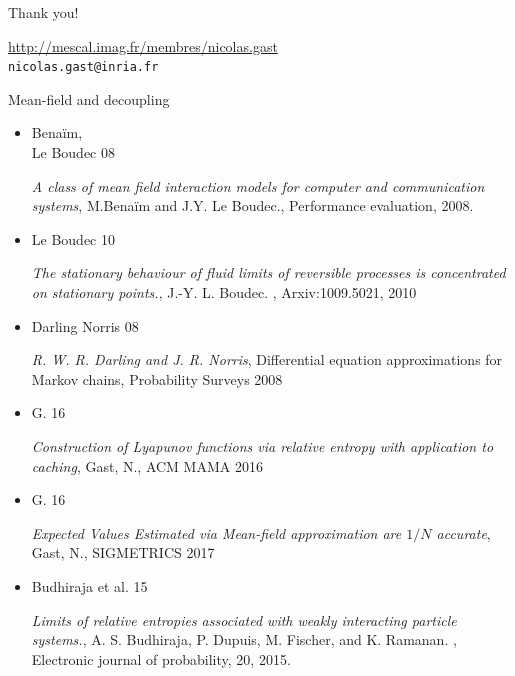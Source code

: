 \documentclass{beamer}
\newcommand\mpage[2]{%
  \begin{minipage}{#1\linewidth}%
    #2%
  \end{minipage}%
}
\begin{document}
\newcommand\reference[4]{\item[\mpage{.2}{\tiny #1}] \footnotesize 
  \emph{#2}, \tiny #3,  #4}
\begin{frame}{Thank you!}

  \begin{center}
    \url{http://mescal.imag.fr/membres/nicolas.gast}\\ \bigskip
    \texttt{nicolas.gast@inria.fr}
  \end{center}
  \bigskip\bigskip
  
  \qquad\qquad\mpage{.85}{
    Mean-field and decoupling
    \begin{itemize}
      \reference{Bena\"im, \\Le Boudec 08}{A class of mean field
        interaction models for computer and communication
        systems}{M.Bena\"im and J.Y. Le Boudec.}{Performance
        evaluation, 2008.}%
      \reference{Le Boudec 10}{The stationary behaviour of fluid
        limits of reversible processes is concentrated on stationary
        points.}{J.-Y. L. Boudec. }{Arxiv:1009.5021, 2010}%
      \reference{Darling Norris 08}{R. W. R. Darling and
        J. R. Norris}{Differential equation approximations for Markov
        chains}{Probability Surveys 2008} %
      \reference{G. 16}{Construction of Lyapunov functions via
        relative entropy with application to caching}{Gast, N.}{ACM
        MAMA 2016}%
      \reference{G. 16}{Expected Values Estimated via Mean-field
        approximation are $1/N$ accurate}{Gast, N.}{SIGMETRICS 2017}%
      \reference{Budhiraja et al. 15}{Limits of relative entropies
        associated with weakly interacting particle
        systems.}{A. S. Budhiraja, P. Dupuis, M. Fischer, and
        K. Ramanan. }{Electronic journal of probability, 20, 2015.}
    \end{itemize}
  }
\end{frame}
\end{document}
